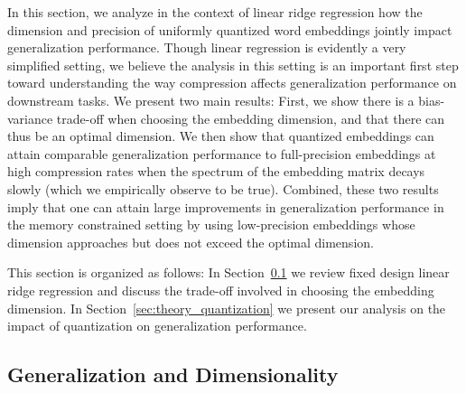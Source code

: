 In this section, we analyze in the context of linear ridge regression how the dimension and precision of uniformly quantized word embeddings jointly impact generalization performance.
Though linear regression is evidently a very simplified setting, we believe the analysis in this setting is an important first step toward understanding the way compression affects generalization performance on downstream tasks.
We present two main results:
First, we show there is a bias-variance trade-off when choosing the embedding dimension, and that there can thus be an optimal dimension.
We then show that quantized embeddings can attain comparable generalization performance to full-precision embeddings at high compression rates when the spectrum of the embedding matrix decays slowly (which we empirically observe to be true).
Combined, these two results imply that one can attain large improvements in generalization performance in the memory constrained setting by using low-precision embeddings whose dimension approaches but does not exceed the optimal dimension.


This section is organized as follows:
In Section~\ref{sec:theory_dim} we review fixed design linear ridge regression and discuss the trade-off involved in choosing the embedding dimension.
In Section~\ref{sec:theory_quantization} we present our analysis on the impact of quantization on generalization performance.

\subsection{Generalization and Dimensionality}
\label{sec:theory_dim}

